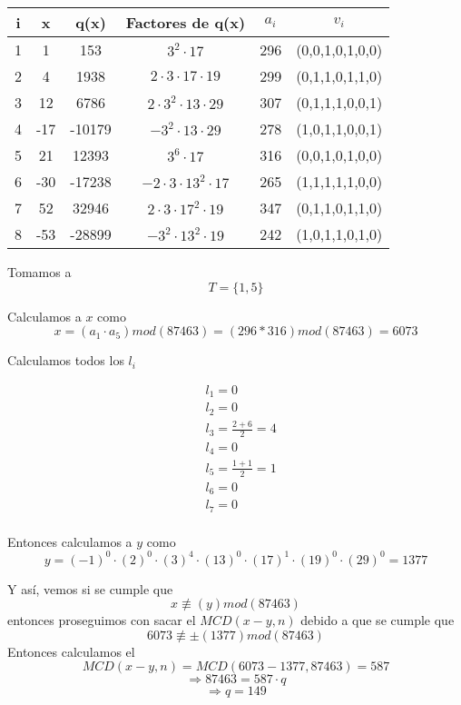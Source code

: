 \documentclass[12pt, letterpaper]{article}
\begin{document}
\begin{itemize}
\begin{center}
\begin{tabular}{|c|c|c|c|c|c|}
\hline 
i & x & q(x) & Factores de q(x) & $a_i$ & $v_i$\\ 
\hline 
1 & 1 & 153 & $3^2\cdot 17$ & 296 & (0,0,1,0,1,0,0)\\ 
\hline
2 & 4 & 1938& $2\cdot3\cdot17\cdot19$ & 299 & (0,1,1,0,1,1,0)\\ 
\hline 
3 & 12 & 6786 & $2\cdot3^2\cdot 13\cdot29$ & 307 & (0,1,1,1,0,0,1)\\ 
\hline
4 & -17 & -10179 & $-3^2\cdot 13 \cdot 29$ & 278 & (1,0,1,1,0,0,1)\\ 
\hline
5 & 21 & 12393 & $3^6\cdot 17$ & 316 & (0,0,1,0,1,0,0)\\
\hline
6 & -30 & -17238 & $-2\cdot3\cdot13^2\cdot17$ & 265 & (1,1,1,1,1,0,0)\\ 
\hline
7 & 52 & 32946 & $2\cdot3\cdot17^2\cdot19$ & 347 & (0,1,1,0,1,1,0)\\ 
\hline
8 & -53 & -28899 & $-3^2\cdot 13^2 \cdot 19$ & 242& (1,0,1,1,0,1,0)\\ 
\hline
\end{tabular} 
\end{center}

Tomamos a \[T = \{1,5\}\]

Calculamos a $x$ como \[x = (a_1 \cdot a_5 )mod (87463) = (296*316) mod (87463) = 6073 \]

Calculamos todos los $l_i$

\begin{equation*}
\begin{split}
&l_1 = 0\\
&l_2 = 0\\
&l_3 = \frac{2+6}{2} = 4\\
&l_4 = 0\\
&l_5 = \frac{1+1}{2} = 1\\
&l_6 = 0\\
&l_7 = 0\\
\end{split}
\end{equation*}

Entonces calculamos a $y$ como\[y = (-1)^0\cdot(2)^0\cdot(3)^4\cdot(13)^0\cdot(17)^1\cdot(19)^0\cdot(29)^0 = 1377\]

Y así, vemos si se cumple que 
$$x \not \equiv (y)mod (87463)$$ entonces proseguimos con sacar el $MCD(x-y, n)$ debido a que se cumple que $$6073 \not \equiv \pm (1377 )mod (87463)$$
Entonces calculamos el 
$$MCD(x-y, n) = MCD(6073-1377, 87463) = 587$$
\[\Rightarrow 87463 = 587 \cdot q\]
\[\Rightarrow q = 149\]


\end{itemize}
\end{document}
